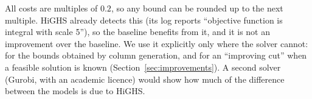 All costs are multiples of $0.2$, so any bound can be rounded up to the
next multiple. HiGHS already detects this (its log reports ``objective
function is integral with scale 5''), so the baseline benefits from it, and
it is not an improvement over the baseline. We use it explicitly only where
the solver cannot: for the bounds obtained by column generation, and for an
``improving cut'' when a feasible solution is known
(Section~\ref{sec:improvements}). A second solver (Gurobi, with an academic
licence) would show how much of the difference between the models is due to
HiGHS.
